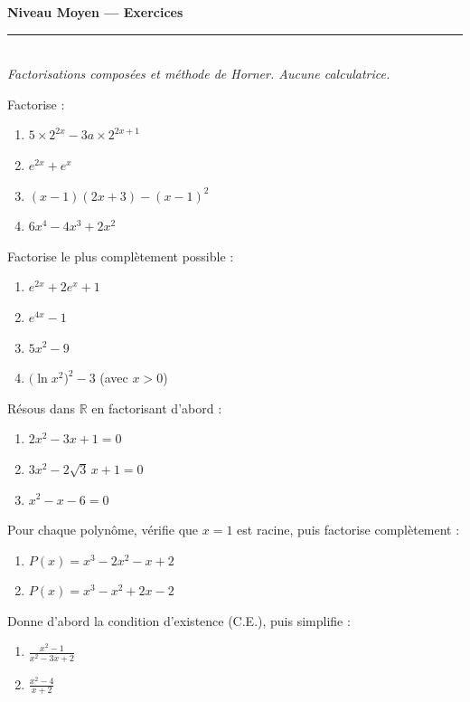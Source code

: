 \documentclass[11pt,a4paper]{article}
\newcommand{\R}{\mathbb{R}}
\newcommand{\ds}{\displaystyle}
\begin{document}
\begin{center}
{\LARGE\bfseries\color{primarydark} Niveau Moyen — Exercices}\\[2pt]
{\color{primary}\rule{0.45\textwidth}{1.2pt}}\\[3pt]
{\small\itshape Factorisations composées et méthode de Horner. Aucune calculatrice.}
\end{center}
\vspace{1mm}

\begin{exo}
Factorise :
\begin{enumerate}[label=\alph*),leftmargin=2em,topsep=1pt,itemsep=1pt]
  \item $5\times 2^{2x}-3a\times 2^{2x+1}$ \qquad
  \item $e^{2x}+e^{x}$ \qquad
  \item $(x-1)(2x+3)-(x-1)^{2}$ \qquad
  \item $6x^{4}-4x^{3}+2x^{2}$
\end{enumerate}
\end{exo}

\begin{exo}
Factorise le plus complètement possible :
\begin{enumerate}[label=\alph*),leftmargin=2em,topsep=1pt,itemsep=1pt]
  \item $e^{2x}+2e^{x}+1$ \qquad
  \item $e^{4x}-1$ \qquad
  \item $5x^{2}-9$ \qquad
  \item $\bigl(\ln x^{2}\bigr)^{2}-3$ (avec $x>0$)
\end{enumerate}
\end{exo}

\begin{exo}
Résous dans $\R$ en factorisant d'abord :
\begin{enumerate}[label=\alph*),leftmargin=2em,topsep=1pt,itemsep=1pt]
  \item $2x^{2}-3x+1=0$ \qquad
  \item $3x^{2}-2\sqrt3\,x+1=0$ \qquad
  \item $x^{2}-x-6=0$
\end{enumerate}
\end{exo}

\begin{exo}
Pour chaque polynôme, vérifie que $x=1$ est racine, puis factorise complètement :
\begin{enumerate}[label=\alph*),leftmargin=2em,topsep=1pt,itemsep=1pt]
  \item $P(x)=x^{3}-2x^{2}-x+2$ \qquad
  \item $P(x)=x^{3}-x^{2}+2x-2$
\end{enumerate}
\end{exo}

\begin{exo}
Donne d'abord la condition d'existence (C.E.), puis simplifie :
\begin{enumerate}[label=\alph*),leftmargin=2em,topsep=1pt,itemsep=1pt]
  \item $\ds\frac{x^{2}-1}{x^{2}-3x+2}$ \qquad
  \item $\ds\frac{x^{2}-4}{x+2}$
\end{enumerate}
\end{exo}
\end{document}

